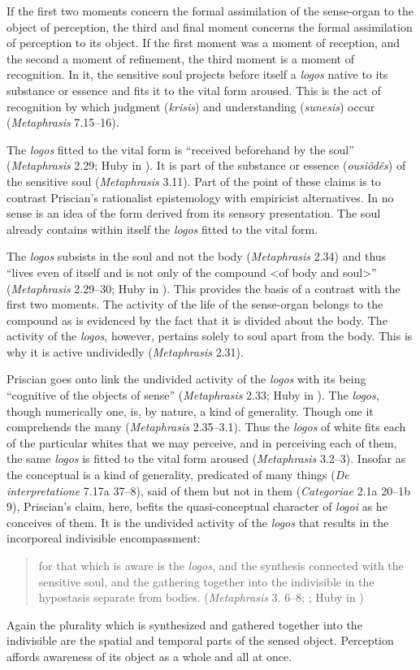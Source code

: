 \documentclass[12pt]{article}
\begin{document}
If the first two moments concern the formal assimilation of the sense-organ to the object of perception, the third and final moment concerns the formal assimilation of perception to its object. If the first moment was a moment of reception, and the second a moment of refinement, the third moment is a moment of recognition. In it, the sensitive soul projects before itself a \emph{logos} native to its substance or essence and fits it to the vital form aroused. This is the act of recognition by which judgment (\emph{krisis}) and understanding (\emph{sunesis}) occur (\emph{Metaphrasis} 7.15--16).

The \emph{logos} fitted to the vital form is ``received beforehand by the soul'' (\emph{Metaphrasis} 2.29; Huby in \citealt[10]{Sorabji:1997ly}). It is part of the substance or essence (\emph{ousiôdês}) of the sensitive soul (\emph{Metaphrasis} 3.11). Part of the point of these claims is to contrast Priscian's rationalist epistemology with empiricist alternatives. In no sense is an idea of the form derived from its sensory presentation. The soul already contains within itself the \emph{logos} fitted to the vital form.

The \emph{logos} subsists in the soul and not the body (\emph{Metaphrasis} 2.34) and thus ``lives even of itself and is not only of the compound <of body and soul>'' (\emph{Metaphrasis} 2.29--30; Huby in \citealt[10]{Sorabji:1997ly}). This provides the basis of a contrast with the first two moments. The activity of the life of the sense-organ belongs to the compound as is evidenced by the fact that it is divided about the body. The activity of the \emph{logos}, however, pertains solely to soul apart from the body. This is why it is active undividedly (\emph{Metaphrasis} 2.31).

Priscian goes onto link the undivided activity of the \emph{logos} with its being ``cognitive of the objects of sense'' (\emph{Metaphrasis} 2.33; Huby in \citealt[10]{Sorabji:1997ly}). The \emph{logos}, though numerically one, is, by nature, a kind of generality. Though one it comprehends the many (\emph{Metaphrasis} 2.35--3.1). Thus the \emph{logos} of white fits each of the particular whites that we may perceive, and in perceiving each of them, the same \emph{logos} is fitted to the vital form aroused (\emph{Metaphrasis} 3.2--3). Insofar as the conceptual is a kind of generality, predicated of many things (\emph{De interpretatione} 7.17a 37--8), said of them but not in them (\emph{Categoriae} 2.1a 20--1b 9), Priscian's claim, here, befits the quasi-conceptual character of \emph{logoi} as he conceives of them. It is the undivided activity of the \emph{logos} that results in the incorporeal indivisible encompassment:
\begin{quote}
	for that which is aware is the \emph{logos}, and the synthesis connected with the sensitive soul, and the gathering together into the indivisible in the hypostasis separate from bodies. (\emph{Metaphrasis} 3. 6--8; ; Huby in \citealt[11]{Sorabji:1997ly})
\end{quote}
Again the plurality which is synthesized and gathered together into the indivisible are the spatial and temporal parts of the sensed object. Perception affords awareness of its object as a whole and all at once.
\end{document}
